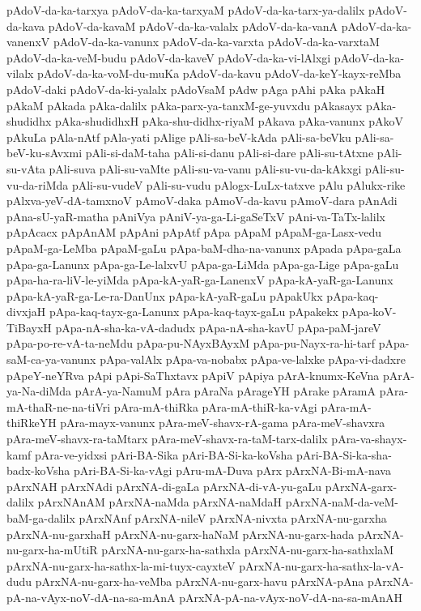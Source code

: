 {pAdoV-da-ka-tarxya
pAdoV-da-ka-tarxyaM
pAdoV-da-ka-tarx-ya-dalilx
pAdoV-da-kava
pAdoV-da-kavaM
pAdoV-da-ka-valalx
pAdoV-da-ka-vanA
pAdoV-da-ka-vanenxV
pAdoV-da-ka-vanunx
pAdoV-da-ka-varxta
pAdoV-da-ka-varxtaM
pAdoV-da-ka-veM-budu
pAdoV-da-kaveV
pAdoV-da-ka-vi-lAlxgi
pAdoV-da-ka-vilalx
pAdoV-da-ka-voM-du-muKa
pAdoV-da-kavu
pAdoV-da-keY-kayx-reMba
pAdoV-daki
pAdoV-da-ki-yalalx
pAdoVsaM
pAdw
pAga
pAhi
pAka
pAkaH
pAkaM
pAkada
pAka-dalilx
pAka-parx-ya-tanxM-ge-yuvxdu
pAkasayx
pAka-shudidhx
pAka-shudidhxH
pAka-shu-didhx-riyaM
pAkava
pAka-vanunx
pAkoV
pAkuLa
pAla-nAtf
pAla-yati
pAlige
pAli-sa-beV-kAda
pAli-sa-beVku
pAli-sa-beV-ku-sAvxmi
pAli-si-daM-taha
pAli-si-danu
pAli-si-dare
pAli-su-tAtxne
pAli-su-vAta
pAli-suva
pAli-su-vaMte
pAli-su-va-vanu
pAli-su-vu-da-kAkxgi
pAli-su-vu-da-riMda
pAli-su-vudeV
pAli-su-vudu
pAlogx-LuLx-tatxve
pAlu
pAlukx-rike
pAlxva-yeV-dA-tamxnoV
pAmoV-daka
pAmoV-da-kavu
pAmoV-dara
pAnAdi
pAna-sU-yaR-matha
pAniVya
pAniV-ya-ga-Li-gaSeTxV
pAni-va-TaTx-lalilx
pApAcacx
pApAnAM
pApAni
pApAtf
pApa
pApaM
pApaM-ga-Lasx-vedu
pApaM-ga-LeMba
pApaM-gaLu
pApa-baM-dha-na-vanunx
pApada
pApa-gaLa
pApa-ga-Lanunx
pApa-ga-Le-lalxvU
pApa-ga-LiMda
pApa-ga-Lige
pApa-gaLu
pApa-ha-ra-liV-le-yiMda
pApa-kA-yaR-ga-LanenxV
pApa-kA-yaR-ga-Lanunx
pApa-kA-yaR-ga-Le-ra-DanUnx
pApa-kA-yaR-gaLu
pApakUkx
pApa-kaq-divxjaH
pApa-kaq-tayx-ga-Lanunx
pApa-kaq-tayx-gaLu
pApakekx
pApa-koV-TiBayxH
pApa-nA-sha-ka-vA-dadudx
pApa-nA-sha-kavU
pApa-paM-jareV
pApa-po-re-vA-ta-neMdu
pApa-pu-NAyxBAyxM
pApa-pu-Nayx-ra-hi-tarf
pApa-saM-ca-ya-vanunx
pApa-valAlx
pApa-va-nobabx
pApa-ve-lalxke
pApa-vi-dadxre
pApeY-neYRva
pApi
pApi-SaThxtavx
pApiV
pApiya
pArA-knumx-KeVna
pArA-ya-Na-diMda
pArA-ya-NamuM
pAra
pAraNa
pArageYH
pArake
pAramA
pAra-mA-thaR-ne-na-tiVri
pAra-mA-thiRka
pAra-mA-thiR-ka-vAgi
pAra-mA-thiRkeYH
pAra-mayx-vanunx
pAra-meV-shavx-rA-gama
pAra-meV-shavxra
pAra-meV-shavx-ra-taMtarx
pAra-meV-shavx-ra-taM-tarx-dalilx
pAra-va-shayx-kamf
pAra-ve-yidxsi
pAri-BA-Sika
pAri-BA-Si-ka-koVsha
pAri-BA-Si-ka-sha-badx-koVsha
pAri-BA-Si-ka-vAgi
pAru-mA-Duva
pArx
pArxNA-Bi-mA-nava
pArxNAH
pArxNAdi
pArxNA-di-gaLa
pArxNA-di-vA-yu-gaLu
pArxNA-garx-dalilx
pArxNAnAM
pArxNA-naMda
pArxNA-naMdaH
pArxNA-naM-da-veM-baM-ga-dalilx
pArxNAnf
pArxNA-nileV
pArxNA-nivxta
pArxNA-nu-garxha
pArxNA-nu-garxhaH
pArxNA-nu-garx-haNaM
pArxNA-nu-garx-hada
pArxNA-nu-garx-ha-mUtiR
pArxNA-nu-garx-ha-sathxla
pArxNA-nu-garx-ha-sathxlaM
pArxNA-nu-garx-ha-sathx-la-mi-tuyx-cayxteV
pArxNA-nu-garx-ha-sathx-la-vA-dudu
pArxNA-nu-garx-ha-veMba
pArxNA-nu-garx-havu
pArxNA-pAna
pArxNA-pA-na-vAyx-noV-dA-na-sa-mAnA
pArxNA-pA-na-vAyx-noV-dA-na-sa-mAnAH
}
